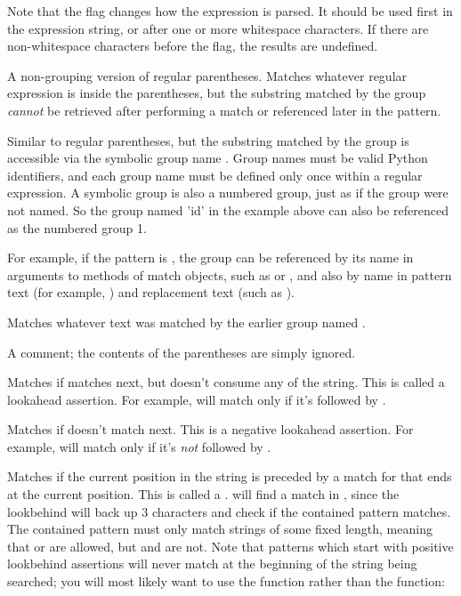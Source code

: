 \begin{description}
Note that the  flag changes how the expression is parsed.
It should be used first in the expression string, or after one or more
whitespace characters.  If there are non-whitespace characters before
the flag, the results are undefined.

\item[\code{(?:...)}] A non-grouping version of regular parentheses.
Matches whatever regular expression is inside the parentheses, but the
substring matched by the
group \emph{cannot} be retrieved after performing a match or
referenced later in the pattern.

\item[\code{(?P<\var{name}>...)}] Similar to regular parentheses, but
the substring matched by the group is accessible via the symbolic group
name .  Group names must be valid Python identifiers, and
each group name must be defined only once within a regular expression.  A
symbolic group is also a numbered group, just as if the group were not
named.  So the group named 'id' in the example above can also be
referenced as the numbered group 1.

For example, if the pattern is
, the group can be referenced by its
name in arguments to methods of match objects, such as
 or , and also by name in
pattern text (for example, ) and replacement text
(such as ).

\item[\code{(?P=\var{name})}] Matches whatever text was matched by the
earlier group named .

\item[\code{(?\#...)}] A comment; the contents of the parentheses are
simply ignored.

\item[\code{(?=...)}] Matches if  matches next, but doesn't
consume any of the string.  This is called a lookahead assertion.  For
example,  will match  only if it's
followed by .

\item[\code{(?!...)}] Matches if  doesn't match next.  This
is a negative lookahead assertion.  For example,
 will match  only if it's \emph{not}
followed by .

\item[\code{(?<=...)}] Matches if the current position in the string
is preceded by a match for  that ends at the current
position.  This is called a .
 will find a match in , since the
lookbehind will back up 3 characters and check if the contained
pattern matches.  The contained pattern must only match strings of
some fixed length, meaning that  or  are
allowed, but  and  are not.  Note that
patterns which start with positive lookbehind assertions will never
match at the beginning of the string being searched; you will most
likely want to use the  function rather than the
 function:


\end{description}
